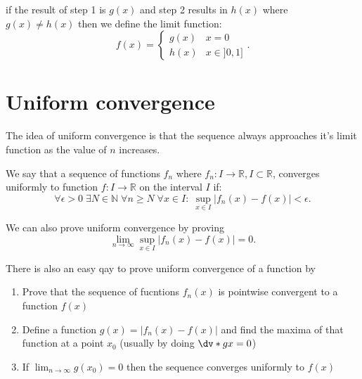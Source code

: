 \begin{remark}
    if the result of step 1 is $g(x)$ and step 2 results in $h(x)$ where $g(x)\neq h(x)$ then we define the limit function:
     \[
         f(x)=\begin{cases}g(x)&x=0\\h(x)&x\in ]0,1]\end{cases}
    .\] 
\end{remark}

\section{Uniform convergence}

The idea of uniform convergence is that the sequence always approaches it's limit function as the value of $n$ increases.

\begin{definition}
    We say that a sequence of functions $f_n$ where $f_n:I \to \mathbb{R},I\subset \mathbb{R}$, converges uniformly to function $f:I\to \mathbb{R}$ on the interval $I$ if:
    \[
        \forall \epsilon>0\;\exists N\in\mathbb{N}\;\forall n\ge N\;\forall x\in I: \; \sup_{x\in I} \left| f_n(x)-f(x) \right| <\epsilon
    .\]    
\end{definition}

\begin{remark}
    We can also prove uniform convergence by proving
    \[
        \lim_{n \to \infty}\sup_{x\in I} \left| f_n(x)-f(x) \right|=0 
    .\] 
\end{remark}

There is also an easy qay to prove uniform convergence of a function by
\begin{enumerate}
    \item Prove that the sequence of fucntions $f_n(x)$ is pointwise convergent to a function $f(x)$ 
        \item Define a function $g(x)=|f_n(x)-f(x)|$ and find the maxima of that function at a point $x_0$ (usually by doing $\dv*{g}{x} =0$)
            \item If $\lim_{n \to \infty}g(x_0)=0 $ then the sequence converges uniformly to $f(x)$
\end{enumerate}



